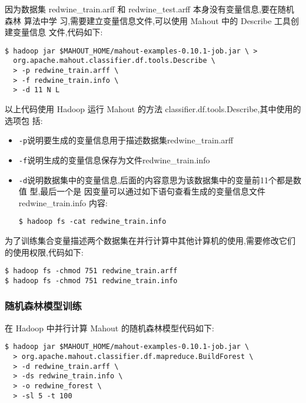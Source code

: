 因为数据集 redwine\_train.arff 和 redwine\_test.arff
本身没有变量信息,要在随机森林 算法中学 习,需要建立变量信息文件,可以使用
Mahout 中的 Describe 工具创建变量信息 文件,代码如下:

\begin{lstlisting}
$ hadoop jar $MAHOUT_HOME/mahout-examples-0.10.1-job.jar \ >
  org.apache.mahout.classifier.df.tools.Describe \
  > -p redwine_train.arff \
  > -f redwine_train.info \
  > -d 11 N L
\end{lstlisting}

以上代码使用 Hadoop 运行 Mahout 的方法
classifier.df.tools.Describe,其中使用的选项包 括:

\begin{itemize}
\item
  \lstinline!-p!说明要生成的变量信息用于描述数据集redwine\_train.arff
\item
  \lstinline!-f!说明生成的变量信息保存为文件redwine\_train.info
\item
  \lstinline!-d!说明数据集中的变量信息,后面的内容意思为该数据集中的变量前11个都是数值
  型,最后一个是 因变量可以通过如下语句查看生成的变量信息文件
  redwine\_train.info 内容:

\begin{lstlisting}
$ hadoop fs -cat redwine_train.info
\end{lstlisting}
\end{itemize}

为了训练集合变量描述两个数据集在并行计算中其他计算机的使用,需要修改它们的使用权限,代码如下:

\begin{lstlisting}
$ hadoop fs -chmod 751 redwine_train.arff
$ hadoop fs -chmod 751 redwine_train.info
\end{lstlisting}

\subsubsection{随机森林模型训练}\label{ux968fux673aux68eeux6797ux6a21ux578bux8badux7ec3}

在 Hadoop 中并行计算 Mahout 的随机森林模型代码如下:

\begin{lstlisting}
$ hadoop jar $MAHOUT_HOME/mahout-examples-0.10.1-job.jar \
  > org.apache.mahout.classifier.df.mapreduce.BuildForest \
  > -d redwine_train.arff \
  > -ds redwine_train.info \
  > -o redwine_forest \
  > -sl 5 -t 100
\end{lstlisting}

